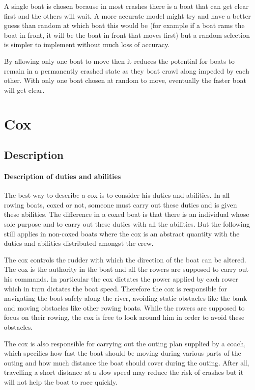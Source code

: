       A single boat is chosen because in most crashes there is a boat that can get clear first and the others will wait. A more accurate model might try and have a better guess than random at which boat this would be (for example if a boat rams the boat in front, it will be the boat in front that moves first) but a random selection is simpler to implement without much loss of accuracy.
      
      By allowing only one boat to move then it reduces the potential for boats to remain in a permanently crashed state as they boat crawl along impeded by each other. With only one boat chosen at random to move, eventually the faster boat will get clear.
      
    \section{Cox}
      \subsection{Description}
      \paragraph{Description of duties and abilities}
      The best way to describe a cox is to consider his duties and abilities. In all rowing boats, coxed or not, someone must carry out these duties and is given these abilities. The difference in a coxed boat is that there is an individual whose sole purpose and to carry out these duties with all the abilities. But the following still applies in non-coxed boats where the cox is an abstract quantity with the duties and abilities distributed amongst the crew.
      
      The cox controls the rudder with which the direction of the boat can be altered. The cox is the authority in the boat and all the rowers are supposed to carry out his commands. In particular the cox dictates the power applied by each rower which in turn dictates the boat speed. Therefore the cox is responsible for navigating the boat safely along the river, avoiding static obstacles like the bank and moving obstacles like other rowing boats. While the rowers are supposed to focus on their rowing, the cox is free to look around him in order to avoid these obstacles. 
      
      The cox is also responsible for carrying out the outing plan supplied by a coach, which specifies how fast the boat should be moving during various parts of the outing and how much distance the boat should cover during the outing. After all, travelling a short distance at a slow speed may reduce the risk of crashes but it will not help the boat to race quickly.
      
